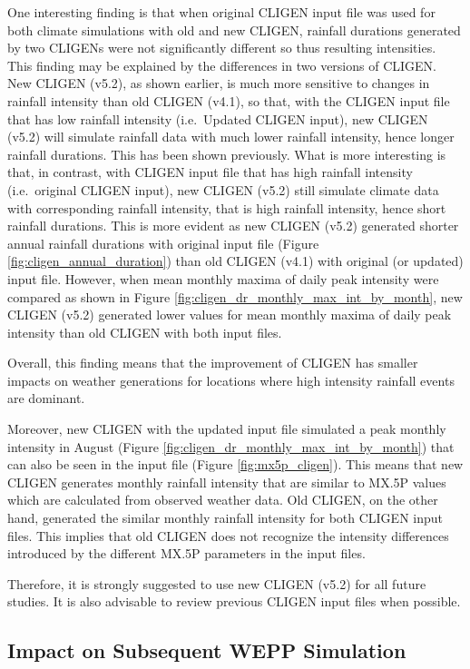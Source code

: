 One interesting finding is that when original CLIGEN input file was used for
both climate simulations with old and new CLIGEN, rainfall durations generated
by two CLIGENs were not significantly different so thus resulting intensities.
This finding may be explained by the differences in two versions of CLIGEN. New
CLIGEN (v5.2), as shown earlier, is much more sensitive to changes in rainfall
intensity than old CLIGEN (v4.1), so that, with the CLIGEN input file that has
low rainfall intensity (i.e.\ Updated CLIGEN input), new CLIGEN (v5.2) will
simulate rainfall data with much lower rainfall intensity, hence longer rainfall
durations. This has been shown previously. What is more interesting is that,
in contrast, with CLIGEN input file that has high rainfall intensity
(i.e.\ original CLIGEN input), new CLIGEN (v5.2) still simulate climate data
with corresponding rainfall intensity, that is high rainfall intensity, hence
short rainfall durations. This is more evident as new CLIGEN (v5.2) generated
shorter annual rainfall durations with original input file (Figure
\ref{fig:cligen_annual_duration}) than old CLIGEN (v4.1) with original (or
updated) input file. However, when mean monthly maxima of daily peak intensity
were compared as shown in Figure \ref{fig:cligen_dr_monthly_max_int_by_month},
new CLIGEN (v5.2) generated lower values for mean monthly maxima of daily peak
intensity than old CLIGEN with both input files.

Overall, this finding means that the improvement of CLIGEN has smaller impacts
on weather generations for locations where high intensity rainfall events are
dominant.

Moreover, new CLIGEN with the updated input file simulated a peak monthly
intensity in August (Figure \ref{fig:cligen_dr_monthly_max_int_by_month}) that
can also be seen in the input file (Figure \ref{fig:mx5p_cligen}). This means
that new CLIGEN generates monthly rainfall intensity that are similar
to {MX.5P} values which are calculated from observed weather data. Old CLIGEN,
on the other hand, generated the similar monthly rainfall intensity for both
CLIGEN input files. This implies that old CLIGEN does not recognize the
intensity differences introduced by the different {MX.5P} parameters in the
input files.

Therefore, it is strongly suggested to use new CLIGEN (v5.2) for all future
studies. It is also advisable to review previous CLIGEN input files when
possible.

\subsection{Impact on Subsequent WEPP Simulation}

